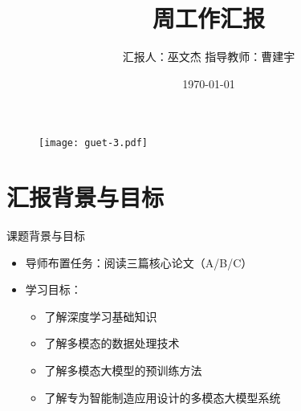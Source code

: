 \documentclass[aspectratio=169,AutoFakeBold]{beamer}
\author{汇报人：巫文杰 \texorpdfstring{\quad}{} 指导教师：曹建宇}
\title{周工作汇报}
\institute{计算机与信息安全学院}
\date{\today}
\begin{document}
\kaishu
\begin{frame}
    \titlepage
    \begin{figure}[htpb]
        \begin{center}
            \texttt{[image: guet-3.pdf]}
        \end{center}
    \end{figure}
\end{frame}

\begin{frame}
    \tableofcontents[sectionstyle=show,subsectionstyle=show/shaded/hide,subsubsectionstyle=show/shaded/hide]    
\end{frame}

\section{汇报背景与目标}
\begin{frame}{课题背景与目标}
    \begin{itemize}
        \item 导师布置任务：阅读三篇核心论文（A/B/C）
        \item 学习目标：
            \begin{itemize}
                \item 了解深度学习基础知识
                \item 了解多模态的数据处理技术
                \item 了解多模态大模型的预训练方法
                \item 了解专为智能制造应用设计的多模态大模型系统
            \end{itemize}
    \end{itemize}
\end{frame}
\end{document}
